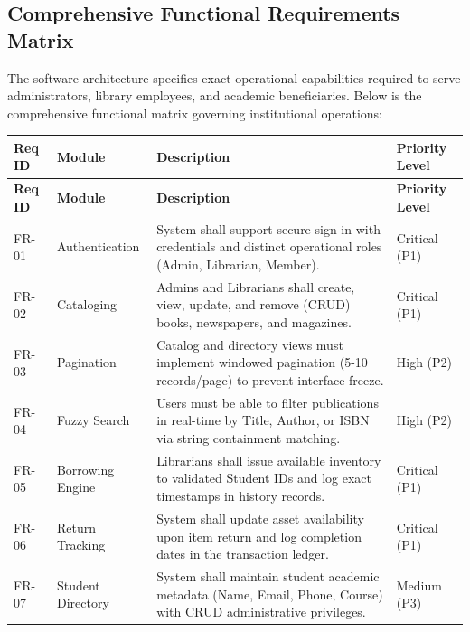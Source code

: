 \documentclass[10pt,journal,compsoc]{IEEEtran}
\begin{document}
\subsection{Comprehensive Functional Requirements Matrix}
The software architecture specifies exact operational capabilities required to serve administrators, library employees, and academic beneficiaries. Below is the comprehensive functional matrix governing institutional operations:

\vspace{10pt}
\noindent
\begin{center}
\renewcommand{\arraystretch}{1.25}
\begin{longtable}{|L{1.8cm}|L{2.8cm}|L{7.5cm}|L{3.0cm}|}
\hline
{}
\textbf{\color{white}Req ID} & \textbf{\color{white}Module} & \textbf{\color{white}Description} & \textbf{\color{white}Priority Level} \\
\hline
\endfirsthead
\hline
{}
\textbf{\color{white}Req ID} & \textbf{\color{white}Module} & \textbf{\color{white}Description} & \textbf{\color{white}Priority Level} \\
\hline
\endhead
FR-01 & Authentication & System shall support secure sign-in with credentials and distinct operational roles (Admin, Librarian, Member). & Critical (P1) \\
\hline
{}
FR-02 & Cataloging & Admins and Librarians shall create, view, update, and remove (CRUD) books, newspapers, and magazines. & Critical (P1) \\
\hline
FR-03 & Pagination & Catalog and directory views must implement windowed pagination (5-10 records/page) to prevent interface freeze. & High (P2) \\
\hline
{}
FR-04 & Fuzzy Search & Users must be able to filter publications in real-time by Title, Author, or ISBN via string containment matching. & High (P2) \\
\hline
FR-05 & Borrowing Engine & Librarians shall issue available inventory to validated Student IDs and log exact timestamps in history records. & Critical (P1) \\
\hline
{}
FR-06 & Return Tracking & System shall update asset availability upon item return and log completion dates in the transaction ledger. & Critical (P1) \\
\hline
FR-07 & Student Directory & System shall maintain student academic metadata (Name, Email, Phone, Course) with CRUD administrative privileges. & Medium (P3) \\

\end{longtable}
\end{center}
\end{document}
